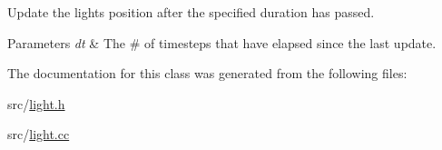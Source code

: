 Update the light\textquotesingle{}s position after the specified duration has passed. 


\begin{DoxyParams}{Parameters}
{\em dt} & The \# of timesteps that have elapsed since the last update. \\
\hline
\end{DoxyParams}


The documentation for this class was generated from the following files\+:\begin{DoxyCompactItemize}
\item 
src/\mbox{\hyperlink{light_8h}{light.\+h}}\item 
src/\mbox{\hyperlink{light_8cc}{light.\+cc}}\end{DoxyCompactItemize}
